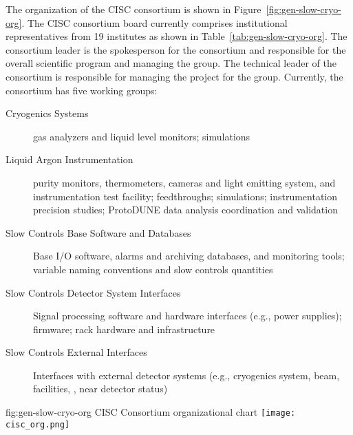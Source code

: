The organization of the CISC consortium is shown in
Figure~\ref{fig:gen-slow-cryo-org}. The CISC consortium board currently comprises institutional representatives from 19 institutes as shown in Table~\ref{tab:gen-slow-cryo-org}.  The consortium leader is the spokesperson for the consortium and responsible for the overall scientific program and managing the group. The technical leader of the consortium is responsible for managing the project for the group. Currently, the
consortium has five working groups:
\begin{description}
 \item[Cryogenics Systems] gas analyzers and liquid level
  monitors;  simulations
 \item[Liquid Argon Instrumentation] purity monitors, thermometers, cameras and light emitting system, and instrumentation test facility; feedthroughs; \efield simulations; instrumentation precision studies; ProtoDUNE data analysis coordination and validation 
 \item [Slow Controls Base Software and Databases]  Base I/O software, alarms and archiving databases, and monitoring tools;
   variable naming conventions and slow controls quantities
 \item [Slow Controls Detector System Interfaces] Signal processing software and hardware interfaces (e.g., power supplies); firmware; rack hardware and infrastructure   
 \item [Slow Controls External Interfaces] Interfaces with external detector systems (e.g., cryogenics system, beam, facilities, , near detector status)
\end{description}

\begin{dunefigure}{fig:gen-slow-cryo-org}
{CISC Consortium organizational chart}
\texttt{[image: cisc\_org.png]}
\end{dunefigure}

